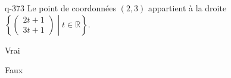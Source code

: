 \begin{truefalse}{q-373}
Le point de coordonnées $(2,3)$ appartient à la droite  $\left\{\begin{pmatrix}2t+1\\3t+1\end{pmatrix}\middle| t\in\mathbb{R}\right\}$.
\item Vrai
\item* Faux
\end{truefalse}

